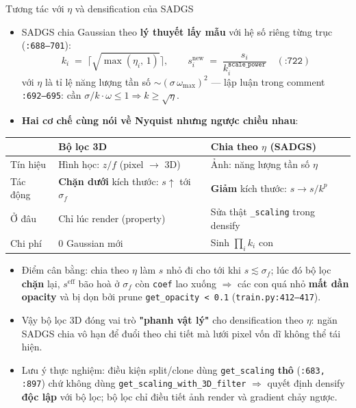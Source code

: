 \begin{frame}{Tương tác với $\eta$ và densification của SADGS}
\footnotesize
\begin{itemize}
    \item SADGS chia Gaussian theo \textbf{lý thuyết lấy mẫu} với hệ số riêng từng trục (\texttt{:688--701}):
    \[
        k_i \;=\; \Big\lceil \sqrt{\max(\eta_i,\,1)} \Big\rceil, \qquad
        s_i^{\text{new}} \;=\; \frac{s_i}{k_i^{\texttt{scale\_power}}} \quad (\texttt{:722})
    \]
    với $\eta$ là tỉ lệ năng lượng tần số $\sim(\sigma\,\omega_{\max})^2$ --- lập luận trong comment \texttt{:692--695}: cần $\sigma/k\cdot\omega\le 1 \Rightarrow k\ge\sqrt{\eta}$.
    \item \textbf{Hai cơ chế cùng nói về Nyquist nhưng ngược chiều nhau}:
\end{itemize}
\vspace{0.1cm}
\centering
\begin{tabular}{lll}
\toprule
 & \textbf{Bộ lọc 3D} & \textbf{Chia theo $\eta$ (SADGS)} \\
\midrule
Tín hiệu & Hình học: $z/f$ (pixel $\to$ 3D) & Ảnh: năng lượng tần số $\eta$ \\
Tác động & \textbf{Chặn dưới} kích thước: $s\!\uparrow$ tới $\sigma_f$ & \textbf{Giảm} kích thước: $s \to s/k^{p}$ \\
Ở đâu & Chỉ lúc render (property) & Sửa thật \texttt{\_scaling} trong densify \\
Chi phí & 0 Gaussian mới & Sinh $\prod_i k_i$ con \\
\bottomrule
\end{tabular}
\vspace{0.15cm}
\begin{itemize}\footnotesize
    \item Điểm cân bằng: chia theo $\eta$ làm $s$ nhỏ đi cho tới khi $s\lesssim \sigma_f$; lúc đó bộ lọc \textbf{chặn} lại, $s^{\text{eff}}$ bão hoà ở $\sigma_f$ còn \texttt{coef} lao xuống $\Rightarrow$ các con quá nhỏ \textbf{mất dần opacity} và bị dọn bởi prune \texttt{get\_opacity < 0.1} (\texttt{train.py:412--417}).
    \item Vậy bộ lọc 3D đóng vai trò \textbf{"phanh vật lý"} cho densification theo $\eta$: ngăn SADGS chia vô hạn để đuổi theo chi tiết mà lưới pixel vốn dĩ không thể tái hiện.
    \item Lưu ý thực nghiệm: điều kiện split/clone dùng \texttt{get\_scaling} \textbf{thô} (\texttt{:683, :897}) chứ không dùng \texttt{get\_scaling\_with\_3D\_filter} $\Rightarrow$ quyết định densify \textbf{độc lập} với bộ lọc; bộ lọc chỉ điều tiết ảnh render và gradient chảy ngược.
\end{itemize}
\end{frame}
